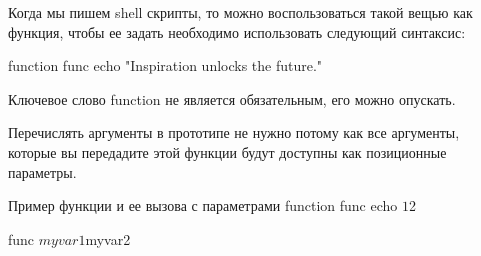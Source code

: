 Когда мы пишем shell скрипты, то можно воспользоваться такой вещью как функция, чтобы ее задать необходимо использовать следующий синтаксис:

\begin{shCode}{ }
	function func {
		echo "Inspiration unlocks the future."
	}
\end{shCode}

Ключевое слово function не является обязательным, его можно опускать.

Перечислять аргументы в прототипе не нужно потому как все аргументы, которые вы передадите этой функции будут доступны как позиционные параметры.

\begin{shCode}{Пример функции и ее вызова с параметрами}
		function func {
			echo $1 $2
		}
	
		func $myvar1 $myvar2
\end{shCode}
